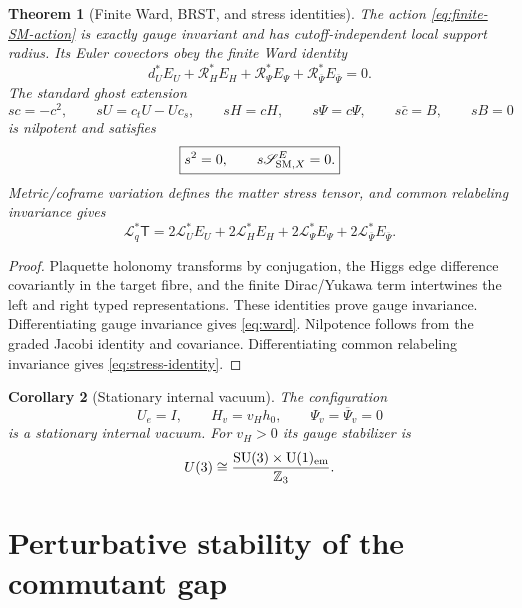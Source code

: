 \documentclass[11pt]{article}
\newtheorem{theorem}{Theorem}[section]
\newtheorem{corollary}[theorem]{Corollary}
\theoremstyle{definition}
\theoremstyle{remark}
\newcommand{\Z}{\mathbb Z}
\newcommand{\U}{\mathrm U}
\newcommand{\SU}{\mathrm{SU}}
\begin{document}
\begin{theorem}[Finite Ward, BRST, and stress identities]
\label{thm:finite-action-identities}
The action \eqref{eq:finite-SM-action} is exactly gauge invariant and has
cutoff-independent local support radius.  Its Euler covectors obey the finite
Ward identity
\begin{equation}
\boxed{
d_U^*E_U
+\mathcal R_H^*E_H
+\mathcal R_\Psi^*E_\Psi
+\mathcal R_{\overline\Psi}^*E_{\overline\Psi}
=0.}
\label{eq:ward}
\end{equation}
The standard ghost extension
\[
sc=-c^2,\qquad
sU=c_tU-Uc_s,\qquad
sH=cH,\qquad
s\Psi=c\Psi,\qquad
s\bar c=B,\qquad
sB=0
\]
is nilpotent and satisfies
\begin{equation}
\boxed{s^2=0,\qquad s\mathscr S_{{\rm SM},X}^{E}=0.}
\label{eq:brst}
\end{equation}
Metric/coframe variation defines the matter stress tensor, and common
relabeling invariance gives
\begin{equation}
\boxed{
\mathcal L_q^*\mathsf T
=
2\mathcal L_U^*E_U
+2\mathcal L_H^*E_H
+2\mathcal L_\Psi^*E_\Psi
+2\mathcal L_{\overline\Psi}^*E_{\overline\Psi}.}
\label{eq:stress-identity}
\end{equation}
\end{theorem}

\begin{proof}
Plaquette holonomy transforms by conjugation, the Higgs edge difference
covariantly in the target fibre, and the finite Dirac/Yukawa term intertwines
the left and right typed representations.  These identities prove gauge
invariance.  Differentiating gauge invariance gives \eqref{eq:ward}.
Nilpotence follows from the graded Jacobi identity and covariance.
Differentiating common relabeling invariance gives
\eqref{eq:stress-identity}.
\end{proof}

\begin{corollary}[Stationary internal vacuum]
\label{cor:internal-vacuum}
The configuration
\[
U_e=I,
\qquad
H_v=v_Hh_0,
\qquad
\Psi_v=\overline\Psi_v=0
\]
is a stationary internal vacuum.  For $v_H>0$ its gauge stabilizer is
\[
U(3)\cong
\frac{\SU(3)\times\U(1)_{\rm em}}{\Z_3}.
\]
\end{corollary}

\section{Perturbative stability of the commutant gap}
\label{app:stability}
\end{document}
